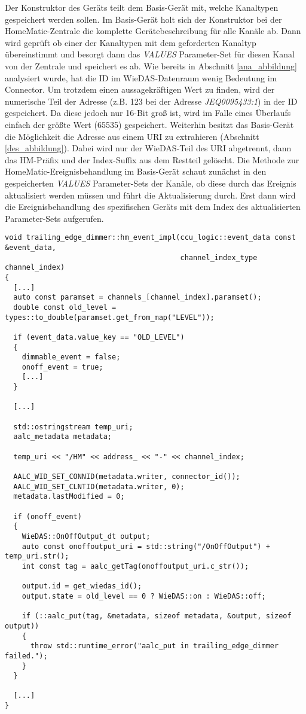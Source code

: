 Der Konstruktor des Geräts teilt dem Basis-Gerät mit, welche Kanaltypen gespeichert werden sollen.
Im Basis-Gerät holt sich der Konstruktor bei der HomeMatic-Zentrale die komplette Gerätebeschreibung für alle Kanäle ab.
Dann wird geprüft ob einer der Kanaltypen mit dem geforderten Kanaltyp übereinstimmt und besorgt dann das \emph{VALUES}
Parameter-Set für diesen Kanal von der Zentrale und speichert es ab.
Wie bereits in Abschnitt \ref{ana_abbildung} analysiert wurde, hat die ID im WieDAS-Datenraum wenig Bedeutung im
Connector.
Um trotzdem einen aussagekräftigen Wert zu finden, wird der numerische Teil der Adresse (z.B. 123 bei der Adresse \emph{JEQ0095433:1})
in der ID gespeichert.
Da diese jedoch nur 16-Bit groß ist, wird im Falle eines Überlaufs einfach der größte Wert (65535) gespeichert.
Weiterhin besitzt das Basis-Gerät die Möglichkeit die Adresse aus einem URI zu extrahieren (Abschnitt \ref{des_abbildung}).
Dabei wird nur der WieDAS-Teil des URI abgetrennt, dann das HM-Präfix und der Index-Suffix aus dem Restteil gelöscht.
Die Methode zur HomeMatic-Ereignisbehandlung im Basis-Gerät schaut zunächst in den gespeicherten \emph{VALUES} Parameter-Sets
der Kanäle, ob diese durch das Ereignis aktualisiert werden müssen und führt die Aktualisierung durch.
Erst dann wird die Ereignisbehandlung des spezifischen Geräts mit dem Index des aktualisierten Parameter-Sets aufgerufen.

\lstset{language=C++}
\begin{lstlisting}[frame=single,caption={Ausschnitt der Implementierung für die HomeMatic-Ereignisbehandlung eines Dimmers},label=ger_hm]
void trailing_edge_dimmer::hm_event_impl(ccu_logic::event_data const &event_data,
                                         channel_index_type channel_index)
{
  [...]
  auto const paramset = channels_[channel_index].paramset();
  double const old_level = types::to_double(paramset.get_from_map("LEVEL"));

  if (event_data.value_key == "OLD_LEVEL")
  {
    dimmable_event = false;
    onoff_event = true;
    [...]
  }

  [...]

  std::ostringstream temp_uri;
  aalc_metadata metadata;

  temp_uri << "/HM" << address_ << "-" << channel_index;

  AALC_WID_SET_CONNID(metadata.writer, connector_id());
  AALC_WID_SET_CLNTID(metadata.writer, 0);
  metadata.lastModified = 0;

  if (onoff_event)
  {
    WieDAS::OnOffOutput_dt output;
    auto const onoffoutput_uri = std::string("/OnOffOutput") + temp_uri.str();
    int const tag = aalc_getTag(onoffoutput_uri.c_str());

    output.id = get_wiedas_id();
    output.state = old_level == 0 ? WieDAS::on : WieDAS::off;

    if (::aalc_put(tag, &metadata, sizeof metadata, &output, sizeof output))
    {
      throw std::runtime_error("aalc_put in trailing_edge_dimmer failed.");
    }
  }

  [...]
}
\end{lstlisting}


